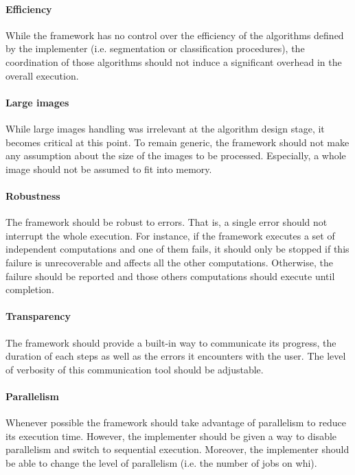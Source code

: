 \paragraph{Efficiency} While the framework has no control over the efficiency of the algorithms defined by the implementer (i.e. segmentation or classification procedures), the coordination of those algorithms should not induce a significant overhead in the overall execution. 

\paragraph{Large images} While large images handling was irrelevant at the algorithm design stage, it becomes critical at this point. To remain generic, the framework should not make any assumption about the size of the images to be processed. Especially, a whole image should not be assumed to fit into memory.

\paragraph{Robustness} The framework should be robust to errors. That is, a single error should not interrupt the whole execution. For instance, if the framework executes a set of independent computations and one of them fails, it should only be stopped if this failure is unrecoverable and affects all the other computations. Otherwise, the failure should be reported and those others computations should execute until completion. 

\paragraph{Transparency} The framework should provide a built-in way to communicate its progress, the duration of each steps as well as the errors it encounters with the user. The level of verbosity of this communication tool should be adjustable. 

\paragraph{Parallelism} Whenever possible the framework should take advantage of parallelism to reduce its execution time. However, the implementer should be given a way to disable parallelism and switch to sequential execution. Moreover, the implementer should be able to change the level of parallelism (i.e. the number of jobs on whi).

